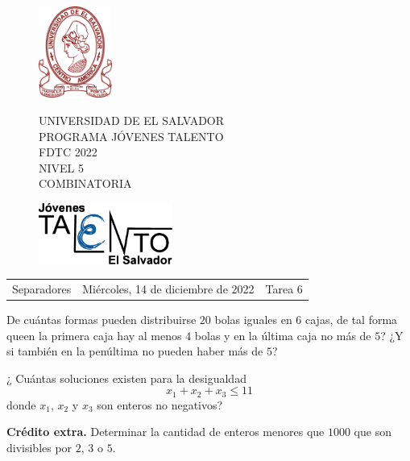 \documentclass[12pt]{article}
\newcommand{\tema}{Separadores}
\newcommand{\fecha}{Miércoles, 14 de diciembre de 2022}
\newcommand{\sesion}{Tarea 6}
\begin{document}
\thispagestyle{empty}

\begin{figure}[h] 
	\begin{minipage}[b]{0.26\textwidth}
		\begin{center}
			\includegraphics[height=3cm]{Logos/UES.png}
			\par\end{center}
	\end{minipage} 
	\begin{minipage}[b]{0.46\textwidth}
		\begin{center}
			UNIVERSIDAD DE EL SALVADOR\\ [0.1cm]
			PROGRAMA JÓVENES TALENTO\\ [0.1cm]
	        FDTC 2022\\ [0.1cm]
                NIVEL 5\\ [0.1cm]
			COMBINATORIA 
			\par\end{center}
	\end{minipage} 
	\begin{minipage}[b]{0.05\textwidth}
		\begin{center}
			\includegraphics[height=2cm]{Logos/LOGO PJT.png}
			\par\end{center}
	\end{minipage}
\end{figure}

\begin{center}
    \begin{tabular}{p{4.5cm} p{7cm} p{4.5cm}}
        \tema & \centering\fecha & \hfill\sesion
    \end{tabular}
\end{center}

\begin{problema}
De cuántas formas pueden distribuirse $20$ bolas iguales en $6$ cajas, de tal forma queen la primera caja hay al menos $4$ bolas y en la última caja no más de $5$? ¿Y si también en la penúltima no pueden haber más de $5$?
\end{problema}

\begin{problema}
¿ Cuántas soluciones existen para la desigualdad
\[x_1+x_2+x_3\leq 11\]
donde $x_1$, $x_2$ y $x_3$ son enteros no negativos?
\end{problema}

\textbf{Crédito extra.} Determinar la cantidad de enteros menores que $1000$ que son divisibles por $2$, $3$ o $5$.
\end{document}
